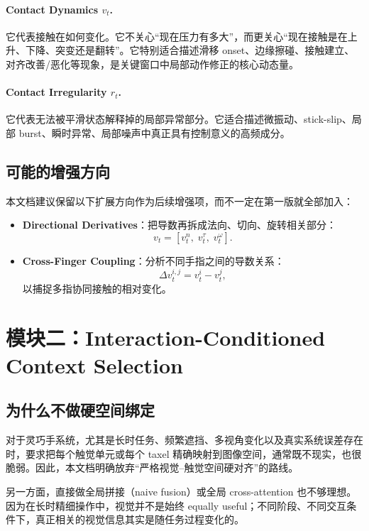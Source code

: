 \documentclass[11pt]{article}
\begin{document}
\paragraph{Contact Dynamics $v_t$.}
它代表接触在如何变化。它不关心“现在压力有多大”，而更关心“现在接触是在上升、下降、突变还是翻转”。它特别适合描述滑移 onset、边缘擦碰、接触建立、对齐改善/恶化等现象，是关键窗口中局部动作修正的核心动态量。

\paragraph{Contact Irregularity $r_t$.}
它代表无法被平滑状态解释掉的局部异常部分。它适合描述微振动、stick-slip、局部 burst、瞬时异常、局部噪声中真正具有控制意义的高频成分。

\subsection{可能的增强方向}

本文档建议保留以下扩展方向作为后续增强项，而不一定在第一版就全部加入：

\begin{itemize}[leftmargin=2em]
    \item \textbf{Directional Derivatives}：把导数再拆成法向、切向、旋转相关部分：
    \[
    v_t = [v_t^n,\; v_t^\tau,\; v_t^\omega].
    \]
    \item \textbf{Cross-Finger Coupling}：分析不同手指之间的导数关系：
    \[
    \Delta v_t^{i,j} = v_t^i - v_t^j,
    \]
    以捕捉多指协同接触的相对变化。
\end{itemize}

\section{模块二：Interaction-Conditioned Context Selection}

\subsection{为什么不做硬空间绑定}

对于灵巧手系统，尤其是长时任务、频繁遮挡、多视角变化以及真实系统误差存在时，要求把每个触觉单元或每个 taxel 精确映射到图像空间，通常既不现实，也很脆弱。因此，本文档明确放弃“严格视觉--触觉空间硬对齐”的路线。

另一方面，直接做全局拼接（naive fusion）或全局 cross-attention 也不够理想。因为在长时精细操作中，视觉并不是始终 equally useful；不同阶段、不同交互条件下，真正相关的视觉信息其实是随任务过程变化的。
\end{document}
